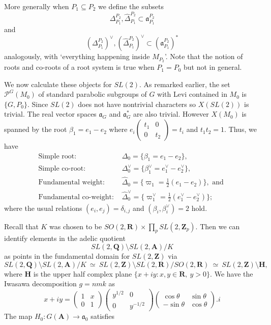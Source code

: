 \documentclass[11pt]{amsart}
\def\A{\mathbf A}
\def\Q{\mathbf Q}
\def\R{\mathbf R}
\def\Z{\mathbf Z}
\def\PPP{\mathcal P}
\def\aaa{\mathfrak a}
\def\bs{\setminus}
\def\se{\subseteq}
\theoremstyle{remark}
\begin{document}
More generally when $P_1 \se P_2$ we define the subsets
\[ \Delta_{P_1}^{P_2}, \hat\Delta_{P_1}^{P_2} \subset \aaa_{P_1}^{P_2} \]
and
\[ (\Delta_{P_1}^{P_2})^\vee, (\hat\Delta_{P_1}^{P_2})^\vee \subset (\aaa_{P_1}^{P_2})^* \]
analogously, with `everything happening inside $M_{P_2}$'. Note that the notion of roots and co-roots of a root system is true when $P_1 = P_0$ but not in general. 

We now calculate these objects for $SL (2)$. As remarked earlier, the set $\PPP^G(M_0)$ of standard parabolic subgroups of $G$ with Levi contained in $M_0$ is $\{G, P_0\}$. Since $SL(2)$ does not have nontrivial characters so $X(SL(2))$ is trivial. The real vector spaces $\aaa_G$ and $\aaa_G^*$ are also trivial. However $X(M_0)$ is spanned by the root $\beta_1 = e_1 - e_2$ where $e_i\begin{pmatrix} t_1 & 0 \\ 0 & t_2 \end{pmatrix} = t_i$ and $t_1 t_2 = 1$. 
Thus, we have
\begin{align*}
	 \text{Simple root: } & \Delta_0 = \{\beta_1 = e_1 - e_2 \}, \\
	 \text{Simple co-root: } & \Delta_0^\vee = \{ \beta_1^\vee = e_1^\vee - e_2^\vee \}, \\
	 \text{Fundamental weight: } & \hat\Delta_0 = \{ \varpi_1 = \frac{1}{2}(e_1 - e_2) \}, \text{ and } \\
	 \text{Fundamental co-weight: } & \hat\Delta_0^\vee = \{ \varpi_1^\vee = \frac{1}{2}(e_1^\vee - e_2^\vee) \};
\end{align*}
where the usual relations $(e_i, e_j) = \delta_{i, j}$ and $(\beta_i, \beta_i^\vee) = 2$ hold. 

Recall that $K$ was chosen to be $SO(2, \R) \times \displaystyle\prod_p SL(2, \Z_p)$. Then we can identify elements in the adelic quotient 
\[ SL(2, \Q) \bs SL(2, \A) / K \]
as points in the fundamental domain for $SL(2, \Z)$ via
\begin{equation} \label{fund_dom} 
SL(2, \Q) \bs SL(2, \A) / K \ \simeq \ SL(2, \Z) \bs SL(2, \R) / SO(2, \R) \ 
		\simeq \ SL(2, \Z) \bs \mathbf H,
\end{equation}
where $\mathbf H$ is the upper half complex plane $\{ x + i y : x, y \in \R, \ y > 0\}$. We have the Iwasawa decomposition $g = nmk$ as 
\[ x + i y = \begin{pmatrix} 1 & x \\ 0 & 1 \end{pmatrix} \begin{pmatrix} y^{1/2} & 0 \\ 0 & y^{-1/2} \end{pmatrix}
		\begin{pmatrix} \cos \theta & \sin \theta \\ -\sin \theta & \cos \theta \end{pmatrix} . i \]
The map $H_0 : G(\A) \to \aaa_0$ satisfies
\end{document}
